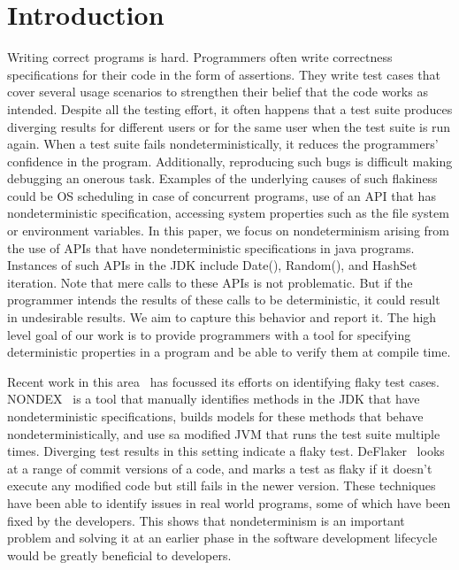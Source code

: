 \section{Introduction}

Writing correct programs is hard. Programmers often write correctness specifications for their code in the form of assertions. They write test cases that cover several usage scenarios to strengthen their belief that
the code works as intended. Despite all the testing effort, it often happens that a test suite produces
diverging results for different users or for the same user when the test suite is run again. When a test suite fails
nondeterministically, it  reduces the programmers' confidence in the program. Additionally, reproducing
such bugs is difficult making debugging an onerous task. Examples of the underlying causes of such flakiness 
could be OS scheduling in case of concurrent programs, use of an API that has nondeterministic specification,
accessing system properties such as the file system or environment variables. In this paper, we focus on
nondeterminism arising from the use of APIs that have nondeterministic specifications in java programs.
Instances of such APIs in the JDK include Date(), Random(), and HashSet iteration. Note that mere calls
to these APIs is not problematic. But if the programmer intends the results of these calls to be deterministic,
it could result in undesirable results. We aim to capture this behavior and report it. The high level goal
of our work is to provide programmers with a tool for specifying  deterministic properties in a program
and be able to verify them at compile time.

Recent work in this area~\cite{nondex,deflaker} has focussed its efforts on identifying flaky test cases.
NONDEX~\cite{nondex} is a tool that manually identifies methods in the JDK that have nondeterministic specifications, builds models for
these methods that behave nondeterministically, and  use sa modified JVM that runs the test suite multiple times.
Diverging test results in this setting indicate a flaky test. DeFlaker~\cite{deflaker} looks at a range of commit versions
of a code, and marks a test as flaky if it doesn't execute any modified code but still fails in the newer version. These techniques
have been able to identify issues in real world programs, some of which have been fixed by the developers. This shows that nondeterminism
is an important problem and solving it at an earlier phase in the software development lifecycle would be greatly beneficial to 
developers. 

